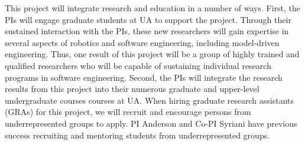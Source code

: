 This project will integrate research and education in a number of ways.
First, the PIs will engage graduate students at UA to support the project.
Through their sustained interaction with the PIs, these new researchers will gain expertise in several aspects of robotics and software engineering, including model-driven engineering.
Thus, one result of this project will be a group of highly trained and qualified researchers who will be capable of sustaining individual research programs in software engineering.
Second, the PIs will integrate the research results from this project into their numerous graduate and upper-level undergraduate courses courses at UA.
When hiring graduate research assistants (GRAs) for this project, we will recruit and encourage persons from underrepresented groups to apply.
PI Anderson and Co-PI Syriani have previous success recruiting and mentoring students from underrepresented groups.





